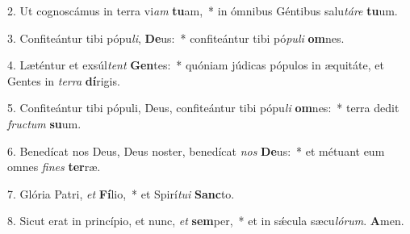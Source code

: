 2. Ut cognoscámus in terra vi\textit{am} \textbf{tu}am,~*  in ómnibus Géntibus salu\textit{tá}\textit{re} \textbf{tu}um.\

3. Confiteántur tibi pópu\textit{li}, \textbf{De}us:~*  confiteántur tibi pó\textit{pu}\textit{li} \textbf{om}nes.\

4. Læténtur et exsúl\textit{tent} \textbf{Gen}tes:~*  quóniam júdicas pópulos in æquitáte, et Gentes in \textit{ter}\textit{ra} \textbf{dí}rigis.\

5. Confiteántur tibi pópuli, Deus, confiteántur tibi pópu\textit{li} \textbf{om}nes:~*  terra dedit \textit{fruc}\textit{tum} \textbf{su}um.\

6. Benedícat nos Deus, Deus noster, benedícat \textit{nos} \textbf{De}us:~*  et métuant eum omnes \textit{fi}\textit{nes} \textbf{ter}ræ.\

7. Glória Patri, \textit{et} \textbf{Fí}lio,~*  et Spirí\textit{tu}\textit{i} \textbf{Sanc}to.\

8. Sicut erat in princípio, et nunc, \textit{et} \textbf{sem}per,~*  et in sǽcula sæcu\textit{ló}\textit{rum}. \textbf{A}men.\

